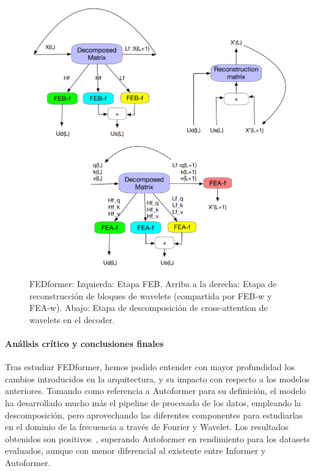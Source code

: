{\begin{figure}[!ht]
    \centering
    \includegraphics[scale=0.35]{img/wavelet.png}
    \caption{FEDformer: Izquierda: Etapa FEB. Arriba a la derecha: Etapa de reconstrucción de bloques de wavelets (compartida por FEB-w y FEA-w). Abajo: Etapa de descomposición de cross-attention de wavelets en el decoder. \cite{zhou2022fedformerfrequencyenhanceddecomposed}}
    \label{wavelet}
\end{figure}

\paragraph{Análisis crítico y conclusiones finales}

Tras estudiar FEDformer, hemos podido entender con mayor profundidad los cambios introducidos en la arquitectura, y su impacto con respecto a los modelos anteriores. Tomando como referencia a Autoformer para su definición, el modelo ha desarrollado mucho más el pipeline de procesado de los datos, empleando la descomposición, pero aprovechando las diferentes componentes para estudiarlas en el dominio de la frecuencia a través de Fourier y Wavelet. Los resultados obtenidos son positivos~\cite{zhou2022fedformerfrequencyenhanceddecomposed}, superando Autoformer en rendimiento para los datasets evaluados, aunque con menor diferencial al existente entre Informer y Autoformer.\\

}
